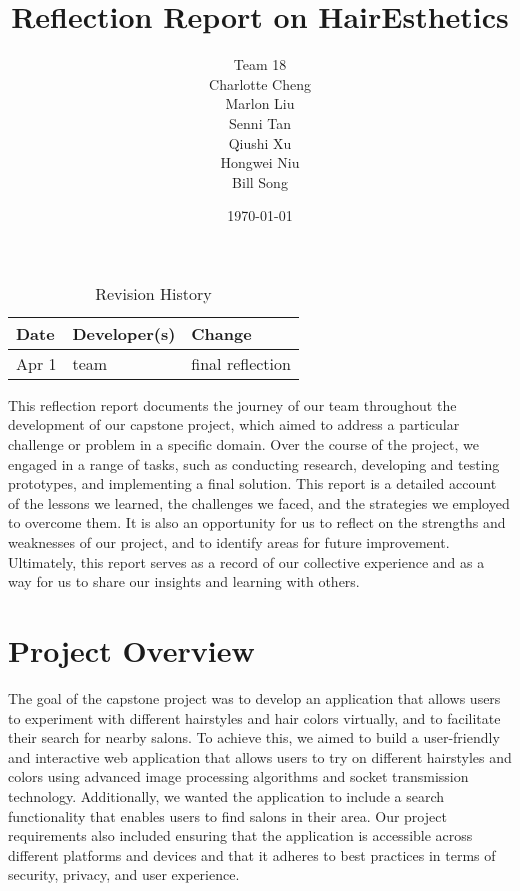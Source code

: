 \documentclass{article}
\title{Reflection Report on HairEsthetics}
\author{Team 18 \\ Charlotte Cheng
        \\ Marlon Liu
        \\ Senni Tan
        \\ Qiushi Xu
        \\ Hongwei Niu
        \\ Bill Song}
\date{\today}
\begin{document}
\begin{table}[hp]
\caption{Revision History} \label{TblRevisionHistory}
\begin{tabularx}{\textwidth}{llX}
\toprule
\textbf{Date} & \textbf{Developer(s)} & \textbf{Change}\\
\midrule
Apr 1 & team & final reflection\\
\bottomrule
\end{tabularx}
\end{table}

\newpage

\maketitle

This reflection report documents the journey of our team throughout the development of our capstone project, which aimed to address a particular challenge or problem in a specific domain. Over the course of the project, we engaged in a range of tasks, such as conducting research, developing and testing prototypes, and implementing a final solution. This report is a detailed account of the lessons we learned, the challenges we faced, and the strategies we employed to overcome them. It is also an opportunity for us to reflect on the strengths and weaknesses of our project, and to identify areas for future improvement. Ultimately, this report serves as a record of our collective experience and as a way for us to share our insights and learning with others.

\section{Project Overview}

The goal of the capstone project was to develop an application that allows users to experiment with different hairstyles and hair colors virtually, and to facilitate their search for nearby salons. To achieve this, we aimed to build a user-friendly and interactive web application that allows users to try on different hairstyles and colors using advanced image processing algorithms and socket transmission technology. Additionally, we wanted the application to include a search functionality that enables users to find salons in their area. Our project requirements also included ensuring that the application is accessible across different platforms and devices and that it adheres to best practices in terms of security, privacy, and user experience.
\end{document}
